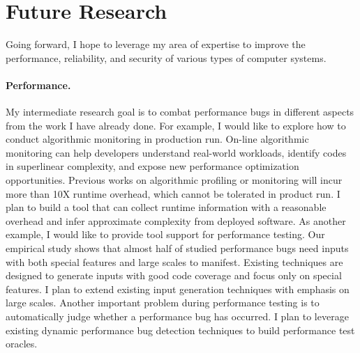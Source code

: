 \documentclass[10pt]{article}
\begin{document}
\section{Future Research}

Going forward, I hope to leverage my area of expertise to improve the performance, 
reliability, and security of various types of computer systems. 

\vspace{-.1in}
\paragraph{Performance.} 
My intermediate research goal is to combat performance bugs 
in different aspects from the work I have already done.
For example, I would like to explore how to conduct algorithmic monitoring in production run. 
On-line algorithmic monitoring can help developers understand real-world workloads, 
identify codes in superlinear complexity, 
and expose new performance optimization opportunities. 
Previous works on algorithmic profiling or monitoring will incur more than 10X runtime overhead, which cannot be tolerated in product run. 
I plan to build a tool that can collect runtime information with a reasonable overhead 
and infer approximate complexity from deployed software. 
As another example, I would like to provide tool support for performance testing.
Our empirical study shows that almost half of studied performance bugs need inputs with both special features and large scales to manifest. 
Existing techniques are designed to generate inputs with good code coverage and focus only on special features.
I plan to extend existing input generation techniques with emphasis on large scales. 
Another important problem during performance testing is to automatically judge whether a performance bug has occurred. 
I plan to leverage existing dynamic performance bug detection techniques to build performance test oracles.

\vspace{-.1in}
\end{document}
